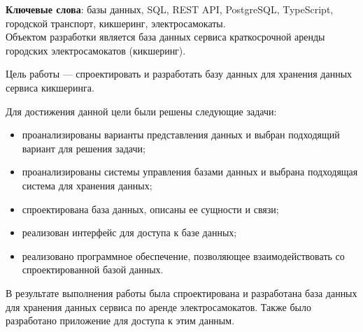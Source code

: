 \begin{essay}{}
    \noindent\textbf{Ключевые слова}: базы данных, SQL, REST API, PostgreSQL, TypeScript, городской транспорт, кикшеринг, электросамокаты.\\
        
    Объектом разработки является база данных сервиса краткосрочной аренды городских электросамокатов (кикшеринг).
    
    Цель работы --- спроектировать и разработать базу данных для хранения данных сервиса кикшеринга.
    
    Для достижения данной цели были решены следующие задачи:
    
    \begin{itemize}
        \item проанализированы варианты представления данных и выбран подходящий вариант для решения задачи;
        \item проанализированы системы управления базами данных и выбрана подходящая система для хранения данных;
        \item спроектирована база данных, описаны ее сущности и связи;
        \item реализован интерфейс для доступа к базе данных;
        \item реализовано программное обеспечение, позволяющее взаимодействовать со спроектированной базой данных.
    \end{itemize}
    
    В результате выполнения работы была спроектирована и разработана база данных для хранения данных сервиса по аренде электросамокатов. Также было разработано приложение для доступа к этим данным.
\end{essay}